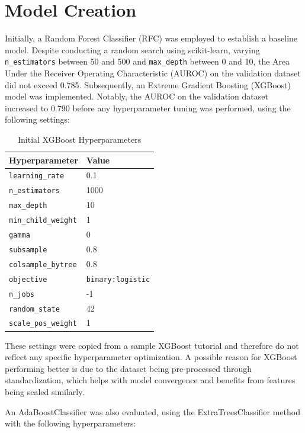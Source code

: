 \documentclass[letterpaper]{article}
\begin{document}
	\section{Model Creation}
	
	Initially, a Random Forest Classifier (RFC) was employed to establish a baseline model. Despite conducting a random search using scikit-learn, varying \texttt{n\_estimators} between 50 and 500 and \texttt{max\_depth} between 0 and 10, the Area Under the Receiver Operating Characteristic (AUROC) on the validation dataset did not exceed 0.785. Subsequently, an Extreme Gradient Boosting (XGBoost) model was implemented. Notably, the AUROC on the validation dataset increased to 0.790 before any hyperparameter tuning was performed, using the following settings:
	
	\begin{table}[H]
		\centering
		\caption{Initial XGBoost Hyperparameters}
		\begin{tabular}{ll}
			\hline
			Hyperparameter & Value \\
			\hline
			\texttt{learning\_rate} & 0.1 \\
			\texttt{n\_estimators} & 1000 \\
			\texttt{max\_depth} & 10 \\
			\texttt{min\_child\_weight} & 1 \\
			\texttt{gamma} & 0 \\
			\texttt{subsample} & 0.8 \\
			\texttt{colsample\_bytree} & 0.8 \\
			\texttt{objective} & \texttt{binary:logistic} \\
			\texttt{n\_jobs} & -1 \\
			\texttt{random\_state} & 42 \\
			\texttt{scale\_pos\_weight} & 1 \\
			\hline
		\end{tabular}
		\label{tab:initial_xgboost_params}
	\end{table}
	
	These settings were copied from a sample XGBoost tutorial and therefore do not reflect any specific hyperparameter optimization. A possible reason for XGBoost performing better is due to the dataset being pre-processed through standardization, which helps with model convergence and benefits from features being scaled similarly.
	
	An AdaBoostClassifier was also evaluated, using the ExtraTreesClassifier method with the following hyperparameters:
	
\end{document}
